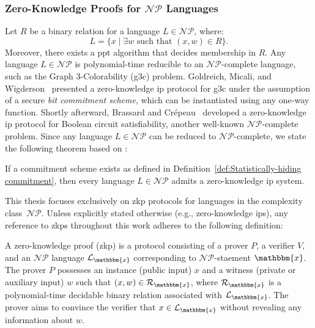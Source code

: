 \subsubsection{Zero-Knowledge Proofs for \texorpdfstring{$\mathcal{NP}$}{NP} Languages}
Let $R$ be a binary relation for a language $L \in \mathcal{NP}$, where:
\[
L = \{x \mid \exists w \text{ such that } (x, w) \in R \}.
\]
Moreover, there exists a \gls{ppt} algorithm that decides membership in $R$. Any language $L \in \mathcal{NP}$ is polynomial-time reducible to an $\mathcal{NP}$-complete language, such as the Graph 3-Colorability (\gls{g3c}) problem. Goldreich, Micali, and Wigderson~\cite{Goldreich1991zk-np} presented a zero-knowledge \gls{ip} protocol for \gls{g3c} under the assumption of a secure \textit{bit commitment scheme}, which can be instantiated using any one-way function.  Shortly afterward, Brassard and Crépeau~\cite{Brassard1986ZKBoolean} developed a zero-knowledge \gls{ip} protocol for Boolean circuit satisfiability, another well-known $\mathcal{NP}$-complete problem. Since any language $L \in \mathcal{NP}$ can be reduced to $\mathcal{NP}$-complete, we state the following theorem based on \cite[Theorem 4.4.11]{Goldreich2001Book}:

\begin{theorem}
	If a commitment scheme exists as defined in Definition~\ref{def:Statistically-hiding commitment}, then every language $L \in \mathcal{NP}$ admits a zero-knowledge \gls{ip} system.
\end{theorem}

This thesis focuses exclusively on \gls{zkp} protocols for languages in the complexity class~$\mathcal{NP}$. Unless explicitly stated otherwise (e.g., zero-knowledge \glspl{ip}), any reference to \glspl{zkp} throughout this work adheres to the following definition:


\begin{definition}
	\label{def:Zero-knowledge Proof}	
	A zero-knowledge proof (\gls{zkp}) is a protocol consisting of a prover $P$, a verifier $V$, and an $\mathcal{NP}$ language $\mathcal{L}_\mathbbm{x}$ corresponding to $\mathcal{NP}$-staement $\mathbbm{x}$. The prover $P$ possesses an instance (public input) $x$ and a witness (private or auxiliary input) $w$ such that $(x, w) \in \mathcal{R}_\mathbbm{x}$, where $\mathcal{R}_\mathbbm{x}$ is a polynomial-time decidable binary relation associated with $\mathcal{L}_\mathbbm{x}$. The prover aims to convince the verifier that $x \in \mathcal{L}_\mathbbm{x}$ without revealing any information about $w$.
\end{definition}


